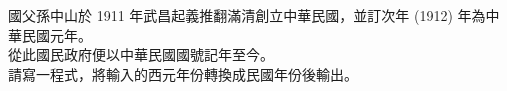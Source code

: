 國父孫中山於 1911 年武昌起義推翻滿清創立中華民國，並訂次年 (1912) 年為中華民國元年。\\
從此國民政府便以中華民國國號記年至今。\\
請寫一程式，將輸入的西元年份轉換成民國年份後輸出。\\

